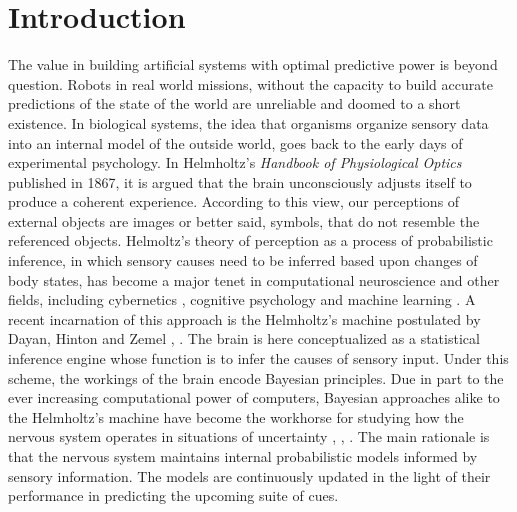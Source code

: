 \documentclass[11pt, onecolumn]{article}
\begin{document}
\section{Introduction}
The value in building artificial systems with optimal predictive power is beyond question. Robots in real world missions, without the capacity to build accurate predictions of the state of the world are unreliable and doomed to a short existence. 
In biological systems, the idea that organisms organize sensory data into an internal model of the outside world, goes back to the early days of experimental psychology. In Helmholtz's \emph{Handbook of Physiological Optics} published in 1867, it is argued that the brain unconsciously adjusts itself to produce a coherent experience. According to this view, our perceptions of external objects are images or better said, symbols, that do not resemble the referenced objects.  Helmoltz's theory of perception as a process of probabilistic inference, in which sensory causes need to be inferred based upon changes of body states, has become a major tenet in computational neuroscience \citep{Dayan:2002} and other fields, including cybernetics \citep{ashby_introduction_2015}, cognitive psychology \citep{neisser_cognitive_2014} and machine learning \citep{neal_view_1998}.
A recent incarnation of this approach is the Helmholtz's machine postulated by Dayan, Hinton and Zemel \citep{dayan_helmholtz_1995}, \citep{dayan_varieties_1996}. The brain is here conceptualized as a statistical inference engine whose function is to infer the causes of sensory input. 
Under this scheme, the workings of the brain encode Bayesian principles. Due in part to the ever increasing computational power of computers, Bayesian approaches alike to the Helmholtz's machine have become the workhorse for studying how the nervous system operates in situations of uncertainty \citep{rao_predictive_1999}, \citep{knill_bayesian_2004}, \citep{friston_history_2012}. 
%
The main rationale is that the nervous system maintains internal probabilistic models informed by sensory information. The models are continuously updated in the light of their performance in predicting the upcoming suite of cues.
\end{document}
